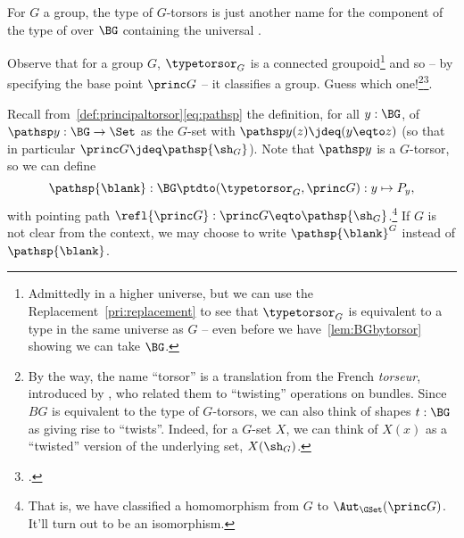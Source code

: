 \begin{remark}
  For $G$ a group, the type of $G$-torsors is just another name for the component of the type of \coverings over $\BG$ containing the universal \covering.

  Observe that for a group $G$, $\typetorsor_G$ is a connected groupoid\footnote{Admittedly in a higher universe, but we can use the
    Replacement~\cref{pri:replacement} to see that $\typetorsor_G$ is equivalent
    to a type in the same universe as $G$ -- even before we
    have~\cref{lem:BGbytorsor} showing we can take $\BG$.}
  and so -- by specifying the base point $\princ G$ -- it classifies a group.
  Guess which one!\footnote{%
    By the way, the name ``torsor'' is a translation from the French \emph{torseur},
    introduced by \citeauthor{giraud1971},\footnotemark{} who
    related them to “twisting” operations on bundles.
    Since $BG$ is equivalent to the type of $G$-torsors,
    we can also think of shapes $t:\BG$ as giving rise to “twists”.
    Indeed, for a $G$-set $X$,
    we can think of $X(x)$ as a ``twisted'' version of the underlying set,
    $X(\sh_G)$.}\footcitetext{giraud1971}.
\end{remark}


\begin{definition}
  \label{def:BG2TorsG}
Recall from~\cref{def:principaltorsor}\eqref{eq:pathsp}
the definition, for all $y:\BG$, of $\pathsp y:\BG\to\Set$
as the $G$-set with $\pathsp y(z)\jdeq(y\eqto z)$
(so that in particular $\princ G\jdeq\pathsp{\sh_G}$).
Note that $\pathsp y$ is a $G$-torsor, so we can define
  \[
    \pathsp{\blank}:\BG\ptdto(\typetorsor_G,\princ G): y\mapsto P_y,
  \]
  with pointing path $\refl{\princ G}:\princ G\eqto\pathsp{\sh_G}$.\footnote{%
    That is, we have classified a homomorphism from $G$
    to $\Aut_{\GSet}(\princ G)$. It'll turn out to be an isomorphism.}
If $G$ is not clear from the context, we may choose to write $\pathsp{\blank}^G$ instead of $\pathsp{\blank}$.
\end{definition}

